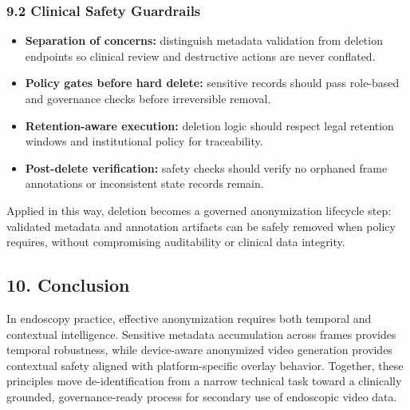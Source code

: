 \subsubsection*{9.2 Clinical Safety Guardrails}
\begin{itemize}
  \item \textbf{Separation of concerns:} distinguish metadata validation from
  deletion endpoints so clinical review and destructive actions are never
  conflated.
  \item \textbf{Policy gates before hard delete:} sensitive records should pass
  role-based and governance checks before irreversible removal.
  \item \textbf{Retention-aware execution:} deletion logic should respect legal
  retention windows and institutional policy for traceability.
  \item \textbf{Post-delete verification:} safety checks should verify no
  orphaned frame annotations or inconsistent state records remain.
\end{itemize}

Applied in this way, deletion becomes a governed anonymization lifecycle step:
validated metadata and annotation artifacts can be safely removed when policy
requires, without compromising auditability or clinical data integrity.

\subsection*{10. Conclusion}
In endoscopy practice, effective anonymization requires both temporal and
contextual intelligence. Sensitive metadata accumulation across frames provides
temporal robustness, while device-aware anonymized video generation provides
contextual safety aligned with platform-specific overlay behavior. Together,
these principles move de-identification from a narrow technical task toward a
clinically grounded, governance-ready process for secondary use of endoscopic
video data.

